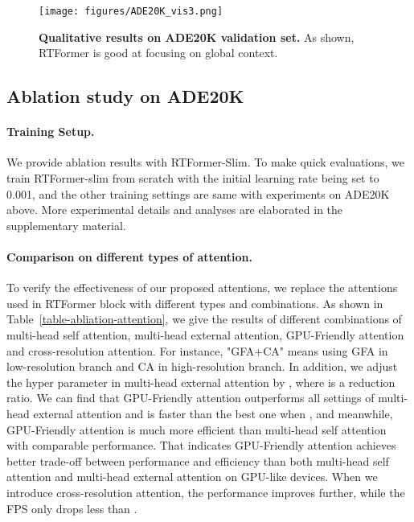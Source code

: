 \documentclass{article}
\begin{document}
\begin{figure}
    \centering
    \texttt{[image: figures/ADE20K\_vis3.png]}
    \caption{\textbf{Qualitative results on ADE20K\cite{ADE20K} validation set.} As shown, RTFormer is good at focusing on global context.}
    \label{fig:vis_ade}
\end{figure}

\subsection{Ablation study on ADE20K}

\paragraph{Training Setup.} We provide ablation results with RTFormer-Slim. To make quick evaluations, we train RTFormer-slim from scratch with the initial learning rate being set to 0.001, and the other training settings are same with experiments on ADE20K\cite{ADE20K} above. More experimental details and analyses are elaborated in the supplementary material.

\vspace{-2mm}
\paragraph{Comparison on different types of attention.}
To verify the effectiveness of our proposed attentions, we replace the attentions used in RTFormer block with different types and combinations. As shown in Table~\ref{table-abliation-attention}, we give the results of different combinations of multi-head self attention, multi-head external attention, GPU-Friendly attention and cross-resolution attention. For instance, "GFA+CA" means using GFA in low-resolution branch and CA in high-resolution branch. In addition, we adjust the hyper parameter  in multi-head external attention by , where  is a reduction ratio. We can find that GPU-Friendly attention outperforms all settings of multi-head external attention and is faster than the best one when , and meanwhile, GPU-Friendly attention is much more efficient than multi-head self attention with comparable performance. That indicates GPU-Friendly attention achieves better trade-off between performance and efficiency than both multi-head self attention and multi-head external attention on GPU-like devices. When we introduce cross-resolution attention, the performance improves further, while the FPS only drops less than .
\end{document}
